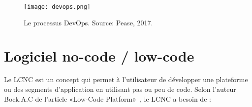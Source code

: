 \begin{figure}[htb]
\centering
\texttt{[image: devops.png]}
\caption{Le processus DevOps. Source: Pease, 2017.~\cite{devops_illustration}}
\label{fig:devops}
\end{figure}


\section{Logiciel no-code / low-code}


Le LCNC est un concept qui permet à l’utilisateur de développer une plateforme ou des segments d'application en utilisant pas ou peu de code. Selon l'auteur Bock.A.C de l'article «Low-Code Platform»~\cite{LC_bock_2021}, le LCNC a besoin de : 
